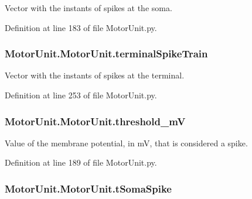 Vector with the instants of spikes at the soma. 



Definition at line 183 of file Motor\+Unit.\+py.

\subsubsection[{\texorpdfstring{terminal\+Spike\+Train}{terminalSpikeTrain}}]{\setlength{\rightskip}{0pt plus 5cm}Motor\+Unit.\+Motor\+Unit.\+terminal\+Spike\+Train}\hypertarget{class_motor_unit_1_1_motor_unit_a2e33990aaab69454943aa00db6b8d2eb}{}\label{class_motor_unit_1_1_motor_unit_a2e33990aaab69454943aa00db6b8d2eb}


Vector with the instants of spikes at the terminal. 



Definition at line 253 of file Motor\+Unit.\+py.

\subsubsection[{\texorpdfstring{threshold\+\_\+mV}{threshold_mV}}]{\setlength{\rightskip}{0pt plus 5cm}Motor\+Unit.\+Motor\+Unit.\+threshold\+\_\+mV}\hypertarget{class_motor_unit_1_1_motor_unit_affbd0b90f1dce6a0f929775e54f8c212}{}\label{class_motor_unit_1_1_motor_unit_affbd0b90f1dce6a0f929775e54f8c212}


Value of the membrane potential, in mV, that is considered a spike. 



Definition at line 189 of file Motor\+Unit.\+py.

\subsubsection[{\texorpdfstring{t\+Soma\+Spike}{tSomaSpike}}]{\setlength{\rightskip}{0pt plus 5cm}Motor\+Unit.\+Motor\+Unit.\+t\+Soma\+Spike}\hypertarget{class_motor_unit_1_1_motor_unit_abca82ec2c7312bb475989bb45e82ca28}{}\label{class_motor_unit_1_1_motor_unit_abca82ec2c7312bb475989bb45e82ca28}


